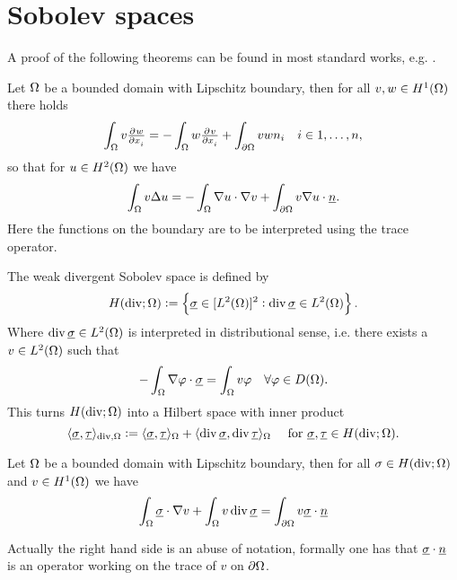 \documentclass[thesis.tex]{subfiles}
\begin{document}
\section{Sobolev spaces}
A proof of the following theorems can be found in most standard works, e.g. \cite{gaticasimple}.
\begin{thm}
  \label{thm:green}
  Let $\Omega$ be a bounded domain with Lipschitz boundary, then for all $v,w \in H^1(\Omega)$  there holds
  \[
    \int_{\O} v \pd{w}{x_i} = - \int_{\O} w \pd{v}{x_i} +   \int_{\partial \O} vw n_i \quad i \in {1,\dots, n},
  \]
  so that for  $u \in H^2(\Omega)$ we have
  \[
    \int_{\Omega} v\Delta u = - \int_{\Omega} \nabla u \cdot \nabla v + \int_{\partial \Omega} v \nabla u \cdot \underline{n}.
  \]
  Here the functions on the boundary are to be interpreted using the trace operator.
\end{thm}
\begin{defn}
  \label{def:hdiv}
The weak divergent Sobolev space is defined by
\[
  H(\operatorname{div}; \Omega) := \set{ \underline{\sigma} \in [L^2(\Omega)]^2 : \operatorname{div}\underline{\sigma} \in L^2(\Omega)}.
  \]
  Where $\operatorname{div} \underline{\sigma} \in L^2(\Omega)$ is interpreted in distributional sense, i.e. there exists a $v\in L^2(\Omega)$ such that
  \[
    - \int_{\Omega} \nabla \varphi \cdot \underline{\sigma} = \int_{\Omega} v\varphi\quad \forall \varphi \in D(\Omega).
  \]
  This turns $H(\operatorname{div}; \Omega)$ into a Hilbert space with inner product
  \[
    \langle \underline{\sigma}, \underline{\tau} \rangle_{\operatorname{div},\Omega} :=  \langle \underline{\sigma}, \underline{\tau} \rangle_{\Omega} + \langle \operatorname{div} \underline{\sigma}, \operatorname{div} \underline{\tau} \rangle_{\Omega}\quad \text{ for } \underline{\sigma}, \underline{\tau} \in H(\operatorname{div}; \Omega).
  \]
\end{defn}
\begin{thm}
  \label{thm:divergence}
  Let $\Omega$ be a bounded domain with Lipschitz boundary, then for all $\sigma \in H(\operatorname{div}; \Omega)$ and $v \in H^1(\Omega)$ we  have
  \[
    \int_\Omega \underline{\sigma} \cdot \nabla v + \int_\Omega  v \operatorname{div} \underline{\sigma} = \int_{\partial \Omega} v \underline{\sigma}\cdot \underline{n}
  \]
\end{thm}
Actually the right hand side is an abuse of notation, formally one has that $\underline{\sigma}\cdot\underline{n}$ is an operator working on the
trace of $v$ on $\partial \Omega$. 
\end{document}
